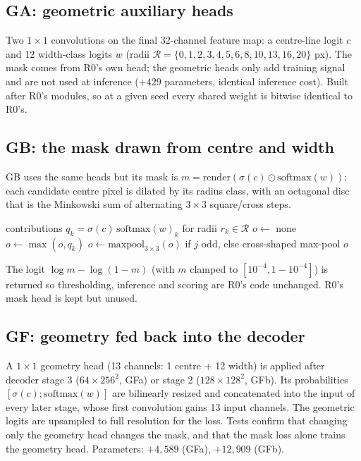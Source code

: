 \documentclass[11pt]{article}
\begin{document}
\subsection{GA: geometric auxiliary heads}
Two $1\times1$ convolutions on the final 32-channel feature map: a centre-line logit $c$ and 12
width-class logits $w$ (radii $\mathcal R = \{0,1,2,3,4,5,6,8,10,13,16,20\}$ px). The mask comes from
R0's own head; the geometric heads only add training signal and are not used at inference
($+429$ parameters, identical inference cost). Built after R0's modules, so at a given seed every
shared weight is bitwise identical to R0's.

\subsection{GB: the mask drawn from centre and width}
GB uses the same heads but its mask is $m = \mathrm{render}(\sigma(c)\odot\mathrm{softmax}(w))$:
each candidate centre pixel is dilated by its radius class, with an octagonal disc that is the
Minkowski sum of alternating $3\times3$ square/cross steps.
\begin{algorithm}[H]
\caption{\texttt{render}: variable-radius dilation in one pass of max-pools}
\begin{algorithmic}[1]
\Require contributions $q_k = \sigma(c)\,\mathrm{softmax}(w)_k$ for radii $r_k\in\mathcal R$
\State $o \gets$ none
   \State $o \gets \max(o, q_k)$ \EndFor
   \State $o \gets \mathrm{maxpool}_{3\times3}(o)$ if $j$ odd, else cross-shaped max-pool \EndIf
\EndFor
\State \Return $o$ 
\end{algorithmic}
\end{algorithm}
The logit $\log m - \log(1-m)$ (with $m$ clamped to $[10^{-4},1-10^{-4}]$) is returned so thresholding,
inference and scoring are R0's code unchanged. R0's mask head is kept but unused.

\subsection{GF: geometry fed back into the decoder}
A $1\times1$ geometry head (13 channels: 1 centre + 12 width) is applied after decoder stage 3
($64\times256^2$, GFa) or stage 2 ($128\times128^2$, GFb). Its probabilities
$[\sigma(c);\mathrm{softmax}(w)]$ are bilinearly resized and concatenated into the input of every later
stage, whose first convolution gains 13 input channels. The geometric logits are upsampled to full
resolution for the loss. Tests confirm that changing only the geometry head changes the mask, and that
the mask loss alone trains the geometry head. Parameters: $+4{,}589$ (GFa), $+12{,}909$ (GFb).
\end{document}
